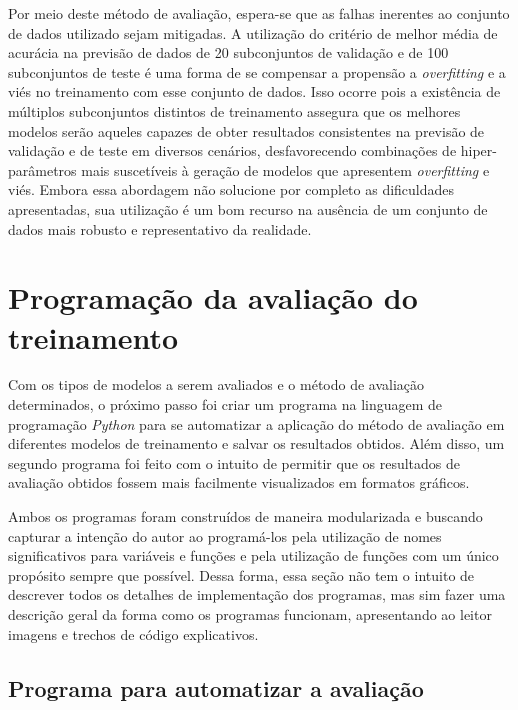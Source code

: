 Por meio deste método de avaliação, espera-se que as falhas inerentes ao conjunto de dados utilizado sejam mitigadas. A utilização do critério de melhor média de acurácia na previsão de dados de 20 subconjuntos de validação e de 100 subconjuntos de teste é uma forma de se compensar a propensão a \textit{overfitting} e a viés no treinamento com esse conjunto de dados. Isso ocorre pois a existência de múltiplos subconjuntos distintos de treinamento assegura que os melhores modelos serão aqueles capazes de obter resultados consistentes na previsão de validação e de teste em diversos cenários, desfavorecendo combinações de hiper-parâmetros mais suscetíveis à geração de modelos que apresentem \textit{overfitting} e viés. Embora essa abordagem não solucione por completo as dificuldades apresentadas, sua utilização é um bom recurso na ausência de um conjunto de dados mais robusto e representativo da realidade.

\section{Programação da avaliação do treinamento}

Com os tipos de modelos a serem avaliados e o método de avaliação determinados, o próximo passo foi criar um programa na linguagem de programação \textit{Python} para se automatizar a aplicação do método de avaliação em diferentes modelos de treinamento e salvar os resultados obtidos. Além disso, um segundo programa foi feito com o intuito de permitir que os resultados de avaliação obtidos fossem mais facilmente visualizados em formatos gráficos.

Ambos os programas foram construídos de maneira modularizada e buscando capturar a intenção do autor ao programá-los pela utilização de nomes significativos para variáveis e funções e pela utilização de funções com um único propósito sempre que possível. Dessa forma, essa seção não tem o intuito de descrever todos os detalhes de implementação dos programas, mas sim fazer uma descrição geral da forma como os programas funcionam, apresentando ao leitor imagens e trechos de código explicativos.

\subsection{Programa para automatizar a avaliação}

